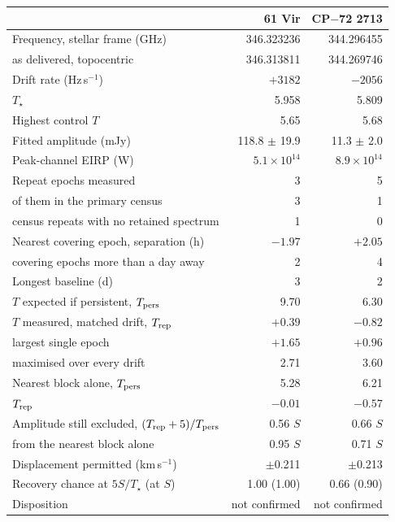 \begin{tabular}{@{}>{\raggedright\arraybackslash}p{}@{~~}r@{~~}r@{}}
\hline
 & 61 Vir & CP$-$72 2713 \\
\hline
Frequency, stellar frame (GHz) & 346.323236 & 344.296455 \\
\quad as delivered, topocentric & 346.313811 & 344.269746 \\
Drift rate (Hz\,s$^{-1}$) & $+3182$ & $-2056$ \\
$T_\star$ & 5.958 & 5.809 \\
Highest control $T$ & 5.65 & 5.68 \\
Fitted amplitude (mJy) & 118.8 $\pm$ 19.9 & 11.3 $\pm$ 2.0 \\
Peak-channel EIRP (W) & $5.1 \times 10^{14}$ & $8.9 \times 10^{14}$ \\
Repeat epochs measured & 3 & 5 \\
\quad of them in the primary census & 3 & 1 \\
\quad census repeats with no retained spectrum & 1 & 0 \\
Nearest covering epoch, separation (h) & $-1.97$ & $+2.05$ \\
\quad covering epochs more than a day away & 2 & 4 \\
Longest baseline (d) & 3 & 2 \\
$T$ expected if persistent, $T_{\rm pers}$ & 9.70 & 6.30 \\
$T$ measured, matched drift, $T_{\rm rep}$ & $+0.39$ & $-0.82$ \\
\quad largest single epoch & $+1.65$ & $+0.96$ \\
\quad maximised over every drift & 2.71 & 3.60 \\
Nearest block alone, $T_{\rm pers}$ & 5.28 & 6.21 \\
\quad $T_{\rm rep}$ & $-0.01$ & $-0.57$ \\
Amplitude still excluded, $(T_{\rm rep}+5)/T_{\rm pers}$ & 0.56 $S$ & 0.66 $S$ \\
\quad from the nearest block alone & 0.95 $S$ & 0.71 $S$ \\
Displacement permitted (km\,s$^{-1}$) & $\pm$0.211 & $\pm$0.213 \\
Recovery chance at $5S/T_\star$ (at $S$) & 1.00 (1.00) & 0.66 (0.90) \\
Disposition & not confirmed & not confirmed \\
\hline
\end{tabular}
